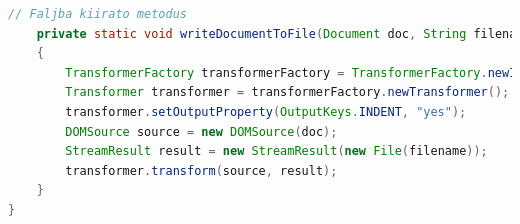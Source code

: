 \documentclass[12pt]{report}
\begin{document}
\begin{lstlisting}[caption={DOMWriteKLNSPG.java} olvasó program, language=Java]
	// Faljba kiirato metodus
	private static void writeDocumentToFile(Document doc, String filename) throws TransformerException 
	{
		TransformerFactory transformerFactory = TransformerFactory.newInstance();
		Transformer transformer = transformerFactory.newTransformer();
		transformer.setOutputProperty(OutputKeys.INDENT, "yes");
		DOMSource source = new DOMSource(doc);
		StreamResult result = new StreamResult(new File(filename));
		transformer.transform(source, result);
	}
}
\end{lstlisting}
\end{document}
